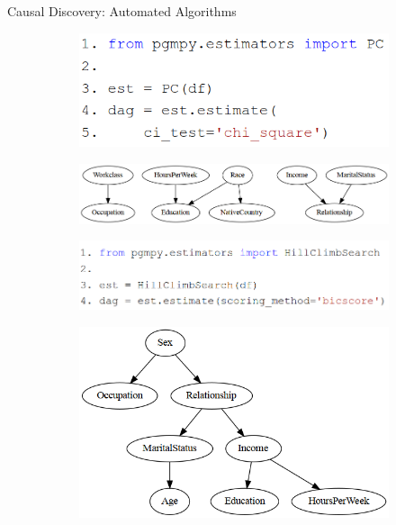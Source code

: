 \documentclass[aspectratio=169]{beamer}
\begin{document}
\begin{frame}{Causal Discovery: Automated Algorithms}
	\begin{figure}
		\begin{subfigure}{0.45 \textwidth}
			\includegraphics[scale=0.28]{imgs/pc_chisquare.png}
		\end{subfigure}%
		\begin{subfigure}{0.55 \textwidth}
			\includegraphics[scale=0.25]{imgs/adult_x2.png}
		\end{subfigure}\vfill
		\begin{subfigure}{0.6 \textwidth}
			\includegraphics[scale=0.28]{imgs/hill_bic.png}
		\end{subfigure}%
		\begin{subfigure}{0.4 \textwidth}
			\includegraphics[scale=0.25]{imgs/adult_bic.png}
		\end{subfigure}
	\end{figure}
\end{frame}
\end{document}
